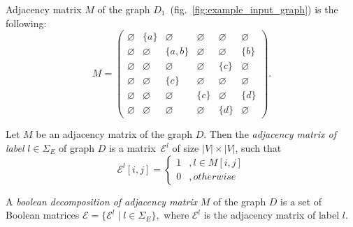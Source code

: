 Adjacency matrix $M$ of the graph $D_1$~(fig.~\ref{fig:example_input_graph}) is the following:
{
    \renewcommand{\arraystretch}{0.7}
    \setlength\arraycolsep{2pt}
$$
    M =
    \begin{pmatrix}
    \varnothing     & \{a\} &   \varnothing      &   \varnothing   &   \varnothing   &   \varnothing   \\
    \varnothing     &   \varnothing   & \{a, b\} &   \varnothing   &    \varnothing  & \{b\} \\
    \varnothing     &   \varnothing   &   \varnothing      &   \varnothing   & \{c\} &   \varnothing   \\
    \varnothing     &   \varnothing   & \{c\}    &   \varnothing   &   \varnothing   &   \varnothing   \\
    \varnothing     &   \varnothing   &   \varnothing      & \{c\} &   \varnothing   & \{d\} \\
    \varnothing     & \varnothing     &   \varnothing      &   \varnothing   & \{d\} &   \varnothing
    \end{pmatrix}.
$$
}

\begin{definition}
Let $M$ be an adjacency matrix of the graph $D$. Then the \emph{adjacency matrix of label} $l \in \Sigma_E$ of graph $D$ is a matrix~$\mathcal{E}^l$ of size  $|V| \times |V|$, such that
\begin{equation*}
\mathcal{E}^l[i,j] =
 \begin{cases}
   1 &, l \in M[i,j]\\
   0 &, otherwise
 \end{cases}
\end{equation*} 
\end{definition}

\begin{definition}
A \emph{boolean decomposition of adjacency matrix} $M$ of the graph $D$ is a set of Boolean matrices $\mathcal{E} = \{\mathcal{E}^l \mid l \in \Sigma_E\},$
where $\mathcal{E}^l$ is the adjacency matrix of label $l$. 
\end{definition}

